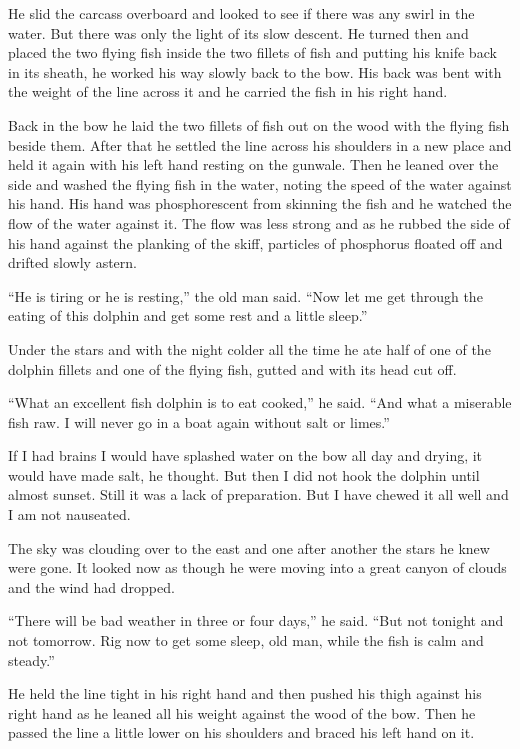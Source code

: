 \documentclass[fontset=ubuntu]{ctexrep}
\newlength{\drop}%
\begin{document}
He slid the carcass overboard and looked to see if there was any swirl in
the water. But there was only the light of its slow \gls{descent}. He turned
then and placed the two flying fish inside the two \glspl{fillet} of fish
and putting his knife back in its sheath, he worked his way slowly back to
the bow. His back was \gls{bent} with the weight of the line across it and
he carried the fish in his right hand.

Back in the bow he laid the two fillets of fish out on the wood with the
flying fish beside them. After that he settled the line across his shoulders
in a new place and held it again with his left hand resting on the gunwale.
Then he leaned over the side and washed the flying fish in the water,
\gls{noting} the speed of the water against his hand. His hand was
phosphorescent from skinning the fish and he watched the flow of the water
against it. The flow was less strong and as he rubbed the side of his hand
against the planking of the skiff, \glspl{particle} of \gls{phosphorus}
floated off and drifted slowly \gls{astern}.

``He is tiring or he is resting,'' the old man said. ``Now let me get
through the eating of this dolphin and get some rest and a little sleep.''

Under the stars and with the night colder all the time he ate half of one
of the dolphin fillets and one of the flying fish, gutted and with its head
cut off.

``What an excellent fish dolphin is to eat cooked,'' he said. ``And what a
\gls{miserable} fish raw. I will never go in a boat again without salt or
limes.''

If I had brains I would have \gls{splashed} water on the bow all day and
drying, it would have made salt, he thought. But then I did not hook the
dolphin until almost sunset. Still it was a lack of \gls{preparation}. But I
have chewed it all well and I am not \gls{nauseated}.

The sky was clouding over to the east and one after another the stars he
knew were gone. It looked now as though he were moving into a great
\gls{canyon} of clouds and the wind had dropped.

``There will be bad weather in three or four days,'' he said. ``But not
tonight and not tomorrow. Rig now to get some sleep, old man, while the fish
is calm and steady.''

He held the line tight in his right hand and then pushed his thigh against
his right hand as he leaned all his weight against the wood of the bow. Then
he passed the line a little lower on his shoulders and braced his left hand
on it.
\end{document}
